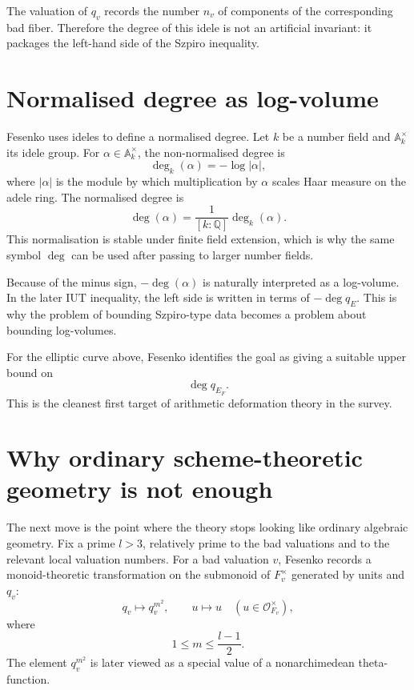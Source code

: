 The valuation of \(q_v\) records the number \(n_v\) of components of the corresponding bad fiber.  Therefore the degree of this idele is not an artificial invariant: it packages the left-hand side of the Szpiro inequality.

\section{Normalised degree as log-volume}

Fesenko uses ideles to define a normalised degree.  Let \(k\) be a number field and \(\mathbb A_k^{\times}\) its idele group.  For \(\alpha\in\mathbb A_k^{\times}\), the non-normalised degree is
\[
  \deg_k(\alpha)=-\log |\alpha|,
\]
where \(|\alpha|\) is the module by which multiplication by \(\alpha\) scales Haar measure on the adele ring.  The normalised degree is
\[
  \deg(\alpha)=\frac{1}{[k:\mathbb Q]}\deg_k(\alpha).
\]
This normalisation is stable under finite field extension, which is why the same symbol \(\deg\) can be used after passing to larger number fields.

\begin{remark}
Because of the minus sign, \(-\deg(\alpha)\) is naturally interpreted as a log-volume.  In the later IUT inequality, the left side is written in terms of \(-\deg q_E\).  This is why the problem of bounding Szpiro-type data becomes a problem about bounding log-volumes.
\end{remark}

For the elliptic curve above, Fesenko identifies the goal as giving a suitable upper bound on
\[
  \deg q_{E_F}.
\]
This is the cleanest first target of arithmetic deformation theory in the survey.

\section{Why ordinary scheme-theoretic geometry is not enough}

The next move is the point where the theory stops looking like ordinary algebraic geometry.  Fix a prime \(l>3\), relatively prime to the bad valuations and to the relevant local valuation numbers.  For a bad valuation \(v\), Fesenko records a monoid-theoretic transformation on the submonoid of \(F_v^{\times}\) generated by units and \(q_v\):
\[
  q_v\longmapsto q_v^{m^2},
  \qquad
  u\longmapsto u\quad (u\in\mathcal O_{F_v}^{\times}),
\]
where
\[
  1\leq m\leq \frac{l-1}{2}.
\]
The element \(q_v^{m^2}\) is later viewed as a special value of a nonarchimedean theta-function.


